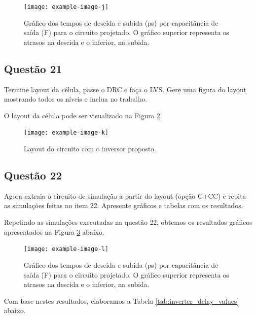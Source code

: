 \documentclass[12pt,a4paper]{article}
\begin{document}
\begin{figure}[H]
    \centering
    \texttt{[image: example-image-j]}
    \caption{Gráfico dos tempos de descida e subida (ps) por capacitância de saída (F) para o circuito projetado. O gráfico superior representa os atrasos na descida e o inferior, na subida.}
    \label{fig:inverter_delay_graphs}
\end{figure}

\subsection*{Questão 21}

Termine layout da célula, passe o DRC e faça o LVS. Gere uma figura do layout mostrando todos os níveis e inclua no trabalho.

O layout da célula pode ser visualizado na Figura \ref{fig:cell_layout}.

\begin{figure}[H]
    \centering
    \texttt{[image: example-image-k]}
    \caption{Layout do circuito com o inversor proposto.}
    \label{fig:cell_layout}
\end{figure}

\subsection*{Questão 22}

Agora extraia o circuito de simulação a partir do layout (opção C+CC) e repita as simulações feitas no item 22. Apresente gráficos e tabelas com os resultados.

Repetindo as simulações executadas na questão 22, obtemos os resultados gráficos apresentados na Figura \ref{fig:inverter_cc_delay_graphs} abaixo.

\begin{figure}[H]
    \centering
    \texttt{[image: example-image-l]}
    \caption{Gráfico dos tempos de descida e subida (ps) por capacitância de saída (F) para o circuito projetado. O gráfico superior representa os atrasos na descida e o inferior, na subida.}
    \label{fig:inverter_cc_delay_graphs}
\end{figure}

Com base nestes resultados, elaboramos a Tabela \ref{tab:inverter_delay_values} abaixo.
\end{document}
